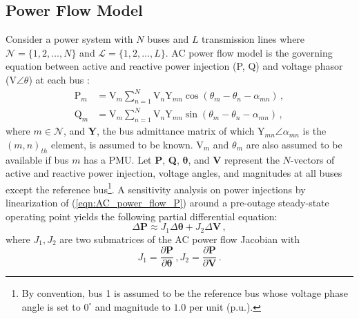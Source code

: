 \subsection{Power Flow Model}
Consider a power system with $N$ buses and $L$ transmission lines where $\mathcal{N} = \{1, 2, \dots, N\}$ and $\mathcal{L} = \{1, 2, \dots, L\}$. AC power flow model is the governing equation between active and reactive power injection (P, Q) and voltage phasor (V$\angle\theta$) at each bus \cite{Glover2012}:
\begin{subequations}
\label{eqn:AC_power_flow_model}
\begin{align}
\text{P}_m &= \text{V}_m \sum_{n=1}^{N} \text{V}_n \text{Y}_{mn} \cos (\theta_m - \theta_n - \alpha_{mn}) \,, \label{eqn:AC_power_flow_P}\\
\text{Q}_m &= \text{V}_m \sum_{n=1}^{N} \text{V}_n \text{Y}_{mn} \sin (\theta_m - \theta_n - \alpha_{mn}) \,, \label{eqn:AC_power_flow_Q}
\end{align}
\end{subequations}
where $m \in \mathcal{N}$, and $\boldsymbol{Y}$, the bus admittance matrix of which Y$_{mn}\angle\alpha_{mn}$ is the $(m,n)_{th}$ element, is assumed to be known. $\text{V}_m$ and $\theta_m$ are also assumed to be available if bus $m$ has a PMU. Let \textbf{P}, \textbf{Q}, $\boldsymbol{\theta}$, and \textbf{V} represent the $N$-vectors of active and reactive power injection, voltage angles, and magnitudes at all buses except the reference bus\footnote{By convention, bus 1 is assumed to be the reference bus whose voltage phase angle is set to $0^\circ$ and magnitude to $1.0$ per unit (p.u.).}. 
A sensitivity analysis on power injections by linearization of (\ref{eqn:AC_power_flow_P}) around a pre-outage steady-state operating point yields the following partial differential equation: 
\begin{equation}
\label{eqn:ac_decoupled_jacobian}
\Delta \textbf{P} \approx J_1 \Delta\boldsymbol{\theta} + J_2 \Delta\textbf{V}\,,
\end{equation}
where ${J}_1, {J}_2$ are two submatrices of the AC power flow Jacobian with 
\begin{equation}
\label{eqn:ac_jacobian}
{J}_1 = \frac{\partial \textbf{P}}{\partial \boldsymbol{\theta}} \,, 
{J}_2 = \frac{\partial \textbf{P}}{\partial \textbf{V}} \,.
\end{equation}
